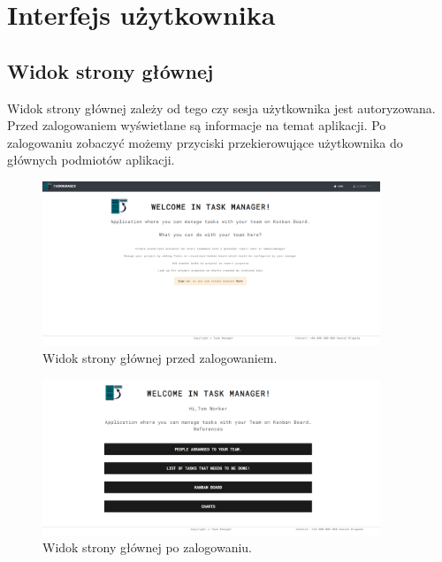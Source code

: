 \chapter{Interfejs użytkownika}
\section{Widok strony głównej}
Widok strony głównej zależy od tego czy sesja użytkownika jest autoryzowana. Przed zalogowaniem wyświetlane są informacje na temat aplikacji. Po zalogowaniu zobaczyć możemy przyciski przekierowujące użytkownika do głównych podmiotów aplikacji.
\begin{figure}[h!]
	\centering
	\includegraphics[width=0.90\textwidth]{home-not-auth}
	
	\caption{Widok strony głównej przed zalogowaniem.}
	\label{not-auth-home}
\end{figure}

\begin{figure}[h!]
	\centering
	\includegraphics[width=0.90\textwidth]{home-auth}
	
	\caption{Widok strony głównej po zalogowaniu.}
	\label{auth-home}
\end{figure}

